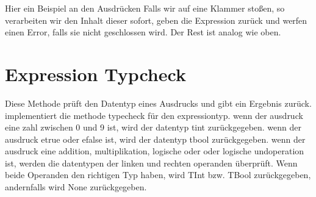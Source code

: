 \documentclass[a4paper, 1ppt]{article}
\begin{document}
Hier ein Beispiel an den Ausdrücken 
Falls wir auf eine Klammer stoßen, so verarbeiten wir den Inhalt dieser sofort, geben die Expression zurück und werfen einen Error, falls sie nicht geschlossen wird. Der Rest ist analog wie oben.
\section{Expression Typcheck}
Diese Methode prüft den Datentyp eines Ausdrucks und gibt ein Ergebnis zurück.
implementiert die methode typecheck für den expressiontyp.
wenn der ausdruck eine zahl zwischen 0 und 9 ist, wird der datentyp tint zurückgegeben.
wenn der ausdruck etrue oder efalse ist, wird der datentyp tbool zurückgegeben.
wenn der ausdruck eine addition, multiplikation, logische oder oder logische undoperation ist, werden die datentypen der linken und rechten operanden überprüft.
Wenn beide Operanden den richtigen Typ haben, wird TInt bzw.
TBool zurückgegeben, andernfalls wird None zurückgegeben.
\end{document}
